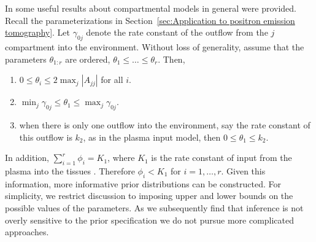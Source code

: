 In \cite{Anderson:1983wk} some useful results about compartmental models in general were provided. Recall the parameterizations in Section~\ref{sec:Application to positron emission tomography}. Let $\gamma_{0j}$ denote the rate constant of the outflow from the $j$\xth compartment into the environment. Without loss of generality, assume that the parameters $\theta_{1:r}$ are ordered, $\theta_1 \le \dots \le \theta_r$. Then,
\begin{enumerate}
  \item $0 \le \theta_i \le 2\max_j|A_{jj}|$ for all $i$.
  \item $\min_j\gamma_{0j} \le \theta_1 \le \max_j\gamma_{0j}$.
  \item when there is only one outflow into the environment, say the rate
    constant of this outflow is $k_2$, as in the plasma input model, then $0
    \le \theta_1 \le k_2$.
\end{enumerate}
In addition, $\sum_{i=1}^r \phi_i = K_1$, where $K_1$ is the rate constant of input from the plasma into the tissues \cite{Gunn:2001cx}. Therefore $\phi_i < K_1$ for $i = 1, \dots, r$. Given this information, more informative prior distributions can be constructed. For simplicity, we restrict discussion to imposing upper and lower bounds on the possible values of the parameters. As we subsequently find that inference is not overly sensitive to the prior specification we do not pursue more complicated approaches.

